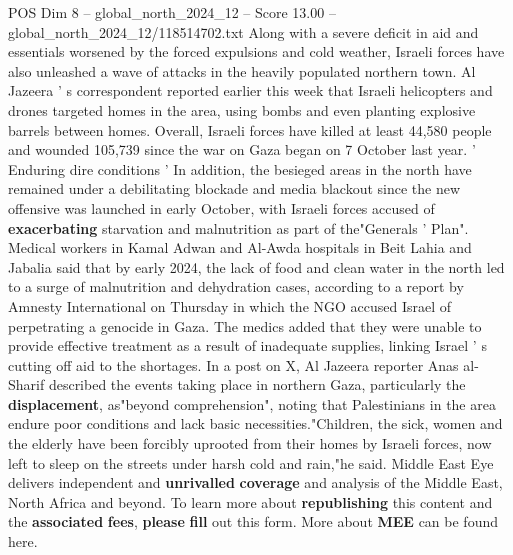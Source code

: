 \begin{textsample}{POS Dim 8 – global\_north\_2024\_12 – Score 13.00 – global\_north\_2024\_12/118514702.txt}
Along with a severe deficit in aid and essentials worsened by the forced expulsions and cold weather, Israeli forces have also unleashed a wave of attacks in the heavily populated northern town.
Al Jazeera ' s correspondent reported earlier this week that Israeli helicopters and drones targeted homes in the area, using bombs and even planting explosive barrels between homes.
Overall, Israeli forces have killed at least 44,580 people and wounded 105,739 since the war on Gaza began on 7 October last year. ' Enduring dire conditions ' In addition, the besieged areas in the north have remained under a debilitating blockade and media blackout since the new offensive was launched in early October, with Israeli forces accused of \textbf{exacerbating} starvation and malnutrition as part of the"Generals ' Plan".
Medical workers in Kamal Adwan and Al-Awda hospitals in Beit Lahia and Jabalia said that by early 2024, the lack of food and clean water in the north led to a surge of malnutrition and dehydration cases, according to a report by Amnesty International on Thursday in which the NGO accused Israel of perpetrating a genocide in Gaza.
The medics added that they were unable to provide effective treatment as a result of inadequate supplies, linking Israel ' s cutting off aid to the shortages.
In a post on X, Al Jazeera reporter Anas al-Sharif described the events taking place in northern Gaza, particularly the \textbf{displacement}, as"beyond comprehension", noting that Palestinians in the area endure poor conditions and lack basic necessities."Children, the sick, women and the elderly have been forcibly uprooted from their homes by Israeli forces, now left to sleep on the streets under harsh cold and rain,"he said.
Middle East Eye delivers independent and \textbf{unrivalled} \textbf{coverage} and analysis of the Middle East, North Africa and beyond.
To learn more about \textbf{republishing} this content and the \textbf{associated} \textbf{fees}, \textbf{please} \textbf{fill} out this form.
More about \textbf{MEE} can be found here.

\end{textsample}
